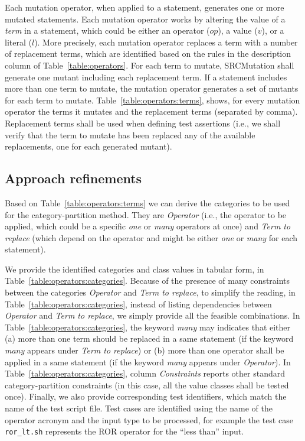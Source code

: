 Each mutation operator, when applied to a statement, generates one or more mutated statements.
Each mutation operator works by altering the value of a \emph{term} in a statement, which could be either an operator  ($op$), a value ($v$), or a literal ($l$). More precisely, each mutation operator replaces a term with a number of replacement terms, which are identified based on the rules in the description column of Table~\ref{table:operators}.
For each term to mutate, SRCMutation shall generate one mutant including each replacement term.
If a statement includes more than one term to mutate, the mutation operator generates a set of mutants for each term to mutate. Table~\ref{table:operators:terms}, shows, for every mutation operator the terms it mutates and the replacement terms (separated by comma). Replacement terms shall be used when defining test assertions (i.e., we shall verify that the term to mutate has been replaced any of the available replacements, one for each generated mutant).




\clearpage

\subsection{Approach refinements}

Based on Table~\ref{table:operators:terms} we can derive the categories to be used for the category-partition method. 
They are \emph{Operator} (i.e., the operator to be applied, which could be a specific \emph{one} or \emph{many} operators at once) and \emph{Term to replace} (which depend on the operator and might be either \emph{one} or \emph{many} for each statement).

We provide the identified categories and class values in tabular form, in Table~\ref{table:operators:categories}. 
Because of the presence of many constraints between the categories \emph{Operator} and \emph{Term to replace}, 
to simplify the reading, in Table~\ref{table:operators:categories}, instead of listing dependencies between \emph{Operator} and \emph{Term to replace}, we simply provide all the feasible combinations.
In Table~\ref{table:operators:categories}, the keyword \emph{many} may indicates that either (a) more than one term should be replaced in a same statement (if the keyword \emph{many} appears under \emph{Term to replace}) or (b) more than one operator shall be applied in a same statement (if the keyword \emph{many} appears under \emph{Operator}).
In Table~\ref{table:operators:categories}, column \emph{Constraints} reports other standard category-partition constraints (in this case, all the value classes shall be tested once).
Finally, we also provide corresponding test identifiers, which match the name of the test script file. Test cases are identified using the name of the operator acronym and the input type to be processed, for example the test case \texttt{ror\_lt.sh} represents the ROR operator for the ``less than'' input.






